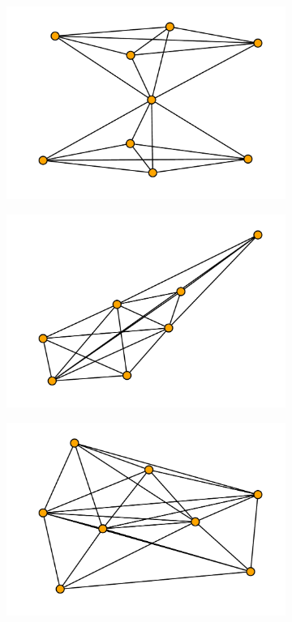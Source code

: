 \documentclass{article}
\begin{document}
\begin{figure}[!hbtp]
\begin{subfigure}{0.3\textwidth}
    \end{subfigure}
    \begin{subfigure}{0.3\textwidth}
        \includegraphics[width=\textwidth]{./assets/images/coauthor05.pdf}
    \end{subfigure}
    \begin{subfigure}{0.3\textwidth}
        \includegraphics[width=\textwidth]{./assets/images/coauthor06.pdf}
    \end{subfigure}
    \begin{subfigure}{0.3\textwidth}
        \includegraphics[width=\textwidth]{./assets/images/coauthor07.pdf}

\end{subfigure}
\end{figure}
\end{document}
